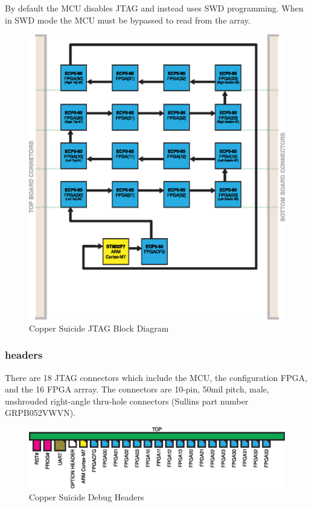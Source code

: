 \documentclass{article}
\begin{document}
By default the MCU disables JTAG and instead uses SWD programming. When in SWD mode the MCU must be bypassed to read from the array.

\begin{figure}[H]
  \centering
  \includegraphics[scale=1]{jtag_daisy.eps}
  \caption{Copper Suicide JTAG Block Diagram}
  \label{fig:jtagdaisy}
\end{figure}

\subsubsection{headers}

There are 18 JTAG connectors which include the MCU, the configuration FPGA, and the 16 FPGA arrray. The connectors are 10-pin, 50mil pitch, male, unshrouded right-angle thru-hole connectors (Sullins part number GRPB052VWVN).

\begin{figure}[H]
  \centering
  \includegraphics[scale=0.6]{cs_headers.eps}
  \caption{Copper Suicide Debug Headers}
  \label{fig:debugheaders}
\end{figure}
\end{document}
